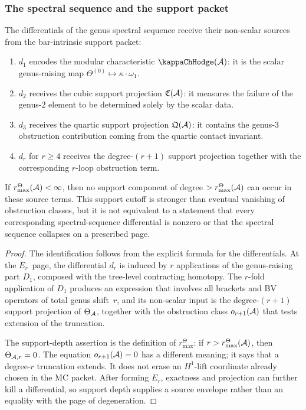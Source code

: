 \subsubsection{The spectral sequence and the support packet}

\begin{theorem}
\label{thm:thqg-VII-ss-shadow-obstruction}
The differentials of the genus spectral sequence receive their
non-scalar sources from the bar-intrinsic support packet:
\begin{enumerate}[label=\textup{(\roman*)}]
\item $d_1$ encodes the modular characteristic $\kappaChHodge(\cA)$:
 it is the scalar genus-raising map
 $\Theta^{(0)} \mapsto \kappa \cdot \omega_1$.
\item $d_2$ receives the cubic support projection $\mathfrak{C}(\mathcal{A})$:
 it measures the failure of the genus-$2$ element to be
 determined solely by the scalar data.
\item $d_3$ receives the quartic support projection $\mathfrak{Q}(\mathcal{A})$:
 it contains the genus-$3$ obstruction contribution coming from the
 quartic contact invariant.
\item $d_r$ for $r \geq 4$ receives the degree-$(r{+}1)$
 support projection together with the corresponding $r$-loop
 obstruction term.
\end{enumerate}
If \(r^\Theta_{\max}(\mathcal{A})<\infty\), then no support component of
degree \(>r^\Theta_{\max}(\mathcal{A})\) can occur in these source terms.
This support cutoff is stronger than eventual vanishing of obstruction
classes, but it is not equivalent to a statement that every
corresponding spectral-sequence differential is nonzero or that the
spectral sequence collapses on a prescribed page.
\end{theorem}

\begin{proof}
The identification follows from the explicit formula for the
differentials. At the $E_r$~page, the differential $d_r$
is induced by $r$ applications of the genus-raising part $D_1$,
composed with the tree-level contracting homotopy. The
$r$-fold application of $D_1$ produces an expression that
involves all brackets and BV operators of total genus shift~$r$,
and its non-scalar input is the degree-$(r{+}1)$ support projection
of \(\Theta_{\mathcal{A}}\), together with the obstruction class
\(o_{r+1}(\mathcal{A})\) that tests extension of the truncation.

The support-depth assertion is the definition of
\(r^\Theta_{\max}\): if \(r>r^\Theta_{\max}(\mathcal{A})\), then
\(\Theta_{\mathcal{A},r}=0\). The equation \(o_{r+1}(\mathcal{A})=0\) has a different
meaning; it says that a degree-\(r\) truncation extends. It does not
erase an \(H^1\)-lift coordinate already chosen in the MC packet.
After forming \(E_r\), exactness and projection can further kill a
differential, so support depth supplies a source envelope rather than
an equality with the page of degeneration.
\end{proof}

